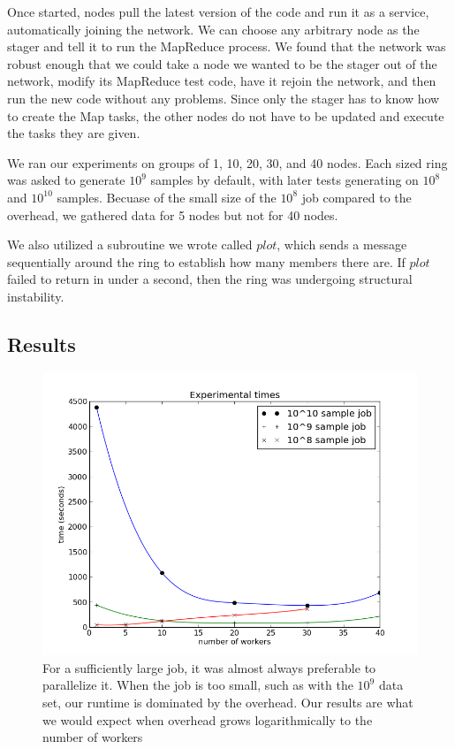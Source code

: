 \documentclass[10pt, conference, compsocconf]{IEEEtran}
\begin{document}
Once started, nodes pull the latest version of the code and run it as a service, automatically joining the network.  We can choose any arbitrary node as the stager and tell it to run the MapReduce process. We found that the network was robust enough that we could take a node we wanted to be the stager out of the network, modify its MapReduce test code, have it rejoin the network, and then run the new code without any problems. Since only the stager has to know how to create the Map tasks, the other nodes do not have to be updated and execute the tasks they are given.

We ran our experiments on groups of 1, 10, 20, 30, and 40 nodes.  Each sized ring was asked to generate $10^{9}$ samples by default, with later tests generating on $10^{8}$ and $10^{10}$ samples.  Becuase of the small size of the $10^{8}$ job compared to the overhead, we gathered data for 5 nodes but not for 40 nodes. 

We also utilized a subroutine we wrote called $plot$, which sends a message sequentially around the ring to establish how many members there are.  If $plot$ failed to return in under a second, then the ring was undergoing structural instability.

\subsection{Results}

\begin{figure}
    \includegraphics[width=\linewidth]{expTime}
    \caption{For a sufficiently large job, it was almost always preferable to parallelize it.  When the job is too small, such as with the $10^{9}$ data set, our runtime is dominated by the overhead.  Our results are what we would expect when overhead grows logarithmically to the number of workers}
    \label{expTime}
\end{figure}
\end{document}
